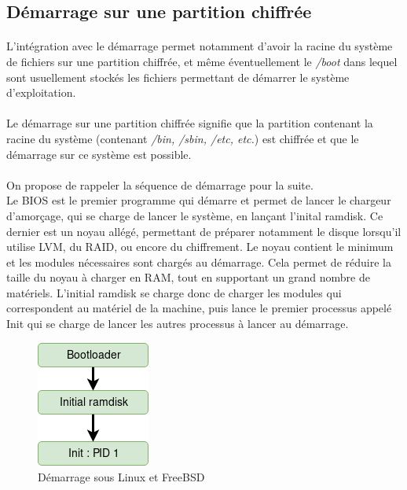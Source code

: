 \subsection{Démarrage sur une partition chiffrée}
\paragraph{}
L'intégration avec le démarrage permet notamment d'avoir la racine du système 
de fichiers sur une partition chiffrée, et même éventuellement le {\em /boot}
dans lequel sont usuellement stockés les fichiers permettant de démarrer le 
système d'exploitation.

\paragraph{}
Le démarrage sur une partition chiffrée signifie que la partition contenant la
racine du système (contenant {\em/bin, /sbin, /etc, etc.}) est chiffrée et que
le démarrage sur ce système est possible.

\paragraph{}
On propose de rappeler la séquence de démarrage pour la suite.
\\
Le BIOS est le premier programme qui démarre et permet de lancer le chargeur d'amorçage, 
qui se charge de lancer le système, en lançant l'inital ramdisk. Ce dernier est un noyau
allégé, permettant de préparer notamment le disque lorsqu'il utilise LVM, du 
RAID, ou encore du chiffrement. Le noyau contient le minimum et les modules
nécessaires sont chargés au démarrage. Cela permet de réduire la taille du noyau
à charger en RAM, tout en supportant un grand nombre de matériels. L'initial
ramdisk se charge donc de charger les modules qui correspondent au matériel de
la machine, puis lance le premier processus appelé Init qui se charge de lancer
les autres processus à lancer au démarrage.


\begin{figure}[h]
\centering
\includegraphics[width=.2\linewidth]{etat_art/Demarrage.png}
\caption{\label{fig:demarrage}Démarrage sous Linux et FreeBSD}
\end{figure}

